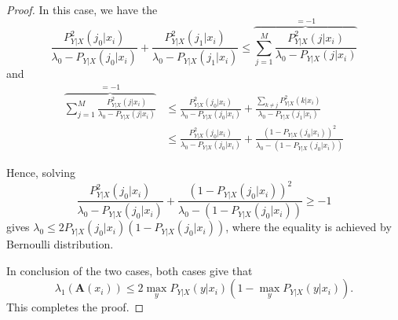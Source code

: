 \documentclass{article} %
\theoremstyle{plain} %
\begin{document}
\begin{proof}
In this case, we have the
\begin{equation*}
    \frac{P_{Y|X}^2(j_0|x_i)}{\lambda_0-P_{Y|X}(j_0|x_i)}+\frac{P_{Y|X}^2(j_1|x_i)}{\lambda_0-P_{Y|X}(j_1|x_i)}\le\overbrace{\sum_{j=1}^M\frac{P_{Y|X}^2(j|x_i)}{\lambda_0-P_{Y|X}(j|x_i)}}^{=-1}
\end{equation*}
and
\begin{align*}
    \overbrace{\sum_{j=1}^M\frac{P_{Y|X}^2(j|x_i)}{\lambda_0-P_{Y|X}(j|x_i)}}^{=-1} & \le\frac{P_{Y|X}^2(j_0|x_i)}{\lambda_0-P_{Y|X}(j_0|x_i)}+\frac{\sum_{k\ne j}P_{Y|X}^2(k|x_i)}{\lambda_0-P_{Y|X}(j_1|x_i)}\\
    & \le\frac{P_{Y|X}^2(j_0|x_i)}{\lambda_0-P_{Y|X}(j_0|x_i)}+\frac{(1-P_{Y|X}(j_0|x_i))^2}{\lambda_0-(1-P_{Y|X}(j_0|x_i))}
\end{align*}

Hence, solving 
$$
\frac{P_{Y|X}^2(j_0|x_i)}{\lambda_0-P_{Y|X}(j_0|x_i)}+\frac{(1-P_{Y|X}(j_0|x_i))^2}{\lambda_0-(1-P_{Y|X}(j_0|x_i))}\ge-1
$$
gives $\lambda_0\le2P_{Y|X}(j_0|x_i)(1-P_{Y|X}(j_0|x_i))$, where the equality is achieved by Bernoulli distribution.

In conclusion of the two cases, both cases give that
\begin{equation*}
    \lambda_1(\textbf{A}(x_i)) \leq 2\max_y P_{Y|X}(y|x_i)\left(1-\max_y P_{Y|X}(y|x_i)\right).
\end{equation*}
This completes the proof.
\end{proof}
\end{document}
